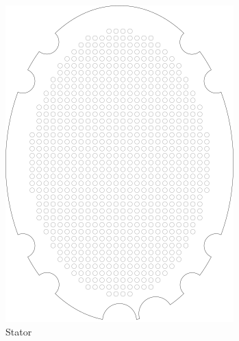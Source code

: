 \documentclass{article}
\begin{document}
\begin{figure}
    \centering
    \begin{subfigure}[b]{0.24\textwidth}
        \includegraphics[width=\textwidth]{images/stator.png}
        \caption{Stator}
        \label{f:driver:stator}
    \end{subfigure}
    \begin{subfigure}[b]{0.24\textwidth}

\end{subfigure}
\end{figure}
\end{document}

